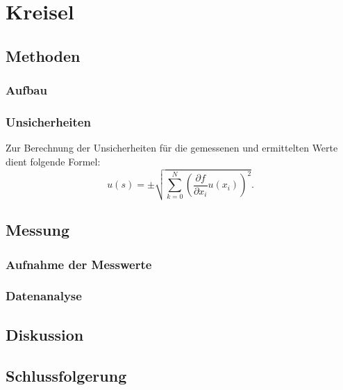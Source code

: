 \section{Kreisel} %

\subsection{Methoden}

	\subsubsection{Aufbau}
	
	\subsubsection{Unsicherheiten}
	
		Zur Berechnung der Unsicherheiten für die gemessenen und ermittelten Werte dient folgende Formel: 
		\begin{equation*}
		u(s) = \pm \sqrt{\sum_{k=0}^{N}\left( \frac{\partial f}{\partial x_i}u(x_i)\right) ^2}. 
		\end{equation*}

\subsection{Messung}

	\subsubsection{Aufnahme der Messwerte}
	
	\subsubsection{Datenanalyse}	

\subsection{Diskussion}

\subsection{Schlussfolgerung}
